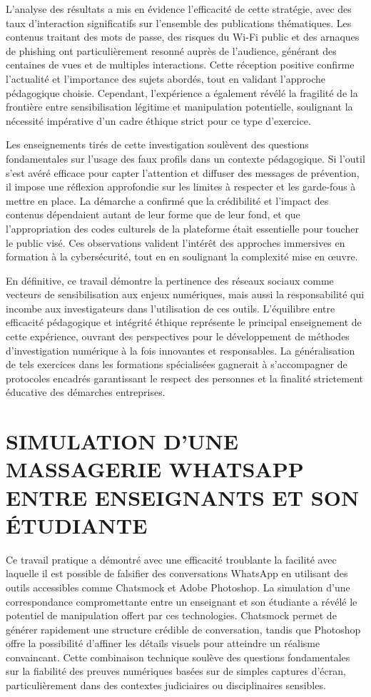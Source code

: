 \documentclass[12pt, a4paper]{article}
\begin{document}
		L'analyse des résultats a mis en évidence l'efficacité de cette stratégie, avec des taux d'interaction significatifs sur l'ensemble des publications thématiques. Les contenus traitant des mots de passe, des risques du Wi-Fi public et des arnaques de phishing ont particulièrement resonné auprès de l'audience, générant des centaines de vues et de multiples interactions. Cette réception positive confirme l'actualité et l'importance des sujets abordés, tout en validant l'approche pédagogique choisie. Cependant, l'expérience a également révélé la fragilité de la frontière entre sensibilisation légitime et manipulation potentielle, soulignant la nécessité impérative d'un cadre éthique strict pour ce type d'exercice.
		
		Les enseignements tirés de cette investigation soulèvent des questions fondamentales sur l'usage des faux profils dans un contexte pédagogique. Si l'outil s'est avéré efficace pour capter l'attention et diffuser des messages de prévention, il impose une réflexion approfondie sur les limites à respecter et les garde-fous à mettre en place. La démarche a confirmé que la crédibilité et l'impact des contenus dépendaient autant de leur forme que de leur fond, et que l'appropriation des codes culturels de la plateforme était essentielle pour toucher le public visé. Ces observations valident l'intérêt des approches immersives en formation à la cybersécurité, tout en en soulignant la complexité mise en œuvre.
		
		En définitive, ce travail démontre la pertinence des réseaux sociaux comme vecteurs de sensibilisation aux enjeux numériques, mais aussi la responsabilité qui incombe aux investigateurs dans l'utilisation de ces outils. L'équilibre entre efficacité pédagogique et intégrité éthique représente le principal enseignement de cette expérience, ouvrant des perspectives pour le développement de méthodes d'investigation numérique à la fois innovantes et responsables. La généralisation de tels exercices dans les formations spécialisées gagnerait à s'accompagner de protocoles encadrés garantissant le respect des personnes et la finalité strictement éducative des démarches entreprises.
		
		\section{SIMULATION D'UNE MASSAGERIE WHATSAPP ENTRE ENSEIGNANTS ET SON ÉTUDIANTE}
		
		Ce travail pratique a démontré avec une efficacité troublante la facilité avec laquelle il est possible de falsifier des conversations WhatsApp en utilisant des outils accessibles comme Chatsmock et Adobe Photoshop. La simulation d'une correspondance compromettante entre un enseignant et son étudiante a révélé le potentiel de manipulation offert par ces technologies. Chatsmock permet de générer rapidement une structure crédible de conversation, tandis que Photoshop offre la possibilité d'affiner les détails visuels pour atteindre un réalisme convaincant. Cette combinaison technique soulève des questions fondamentales sur la fiabilité des preuves numériques basées sur de simples captures d'écran, particulièrement dans des contextes judiciaires ou disciplinaires sensibles.
		
\end{document}
